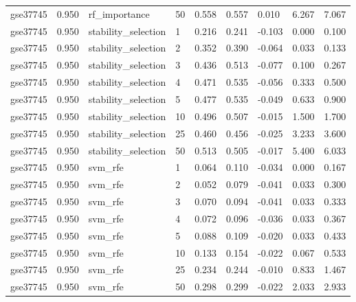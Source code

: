 \begin{table}[t]
\begin{tabular}{lllllllll}
    gse37745 & 0.950 & rf\_importance & 50 & 0.558 & 0.557 & 0.010 & 6.267 & 7.067 \\
    gse37745 & 0.950 & stability\_selection & 1 & 0.216 & 0.241 & -0.103 & 0.000 & 0.100 \\
    gse37745 & 0.950 & stability\_selection & 2 & 0.352 & 0.390 & -0.064 & 0.033 & 0.133 \\
    gse37745 & 0.950 & stability\_selection & 3 & 0.436 & 0.513 & -0.077 & 0.100 & 0.267 \\
    gse37745 & 0.950 & stability\_selection & 4 & 0.471 & 0.535 & -0.056 & 0.333 & 0.500 \\
    gse37745 & 0.950 & stability\_selection & 5 & 0.477 & 0.535 & -0.049 & 0.633 & 0.900 \\
    gse37745 & 0.950 & stability\_selection & 10 & 0.496 & 0.507 & -0.015 & 1.500 & 1.700 \\
    gse37745 & 0.950 & stability\_selection & 25 & 0.460 & 0.456 & -0.025 & 3.233 & 3.600 \\
    gse37745 & 0.950 & stability\_selection & 50 & 0.513 & 0.505 & -0.017 & 5.400 & 6.033 \\
    gse37745 & 0.950 & svm\_rfe & 1 & 0.064 & 0.110 & -0.034 & 0.000 & 0.167 \\
    gse37745 & 0.950 & svm\_rfe & 2 & 0.052 & 0.079 & -0.041 & 0.033 & 0.300 \\
    gse37745 & 0.950 & svm\_rfe & 3 & 0.070 & 0.094 & -0.041 & 0.033 & 0.333 \\
    gse37745 & 0.950 & svm\_rfe & 4 & 0.072 & 0.096 & -0.036 & 0.033 & 0.367 \\
    gse37745 & 0.950 & svm\_rfe & 5 & 0.088 & 0.109 & -0.020 & 0.033 & 0.433 \\
    gse37745 & 0.950 & svm\_rfe & 10 & 0.133 & 0.154 & -0.022 & 0.067 & 0.533 \\
    gse37745 & 0.950 & svm\_rfe & 25 & 0.234 & 0.244 & -0.010 & 0.833 & 1.467 \\
    gse37745 & 0.950 & svm\_rfe & 50 & 0.298 & 0.299 & -0.022 & 2.033 & 2.933 \\
    \bottomrule
  \end{tabular}
\end{table}
